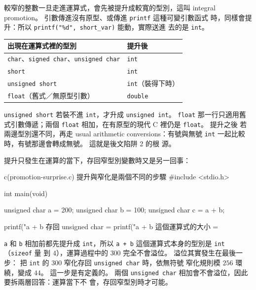 較窄的整數一旦走進運算式，會先被提升成較寬的型別，這叫 integral
promotion。 引數傳進沒有原型、或傳進 \texttt{printf} 這種可變引數函式
時，同樣會提升：所以 \texttt{printf("\%d", short\_var)} 能動，實際送進
去的是 \texttt{int}。

\begin{center}
\begin{tabular}{|l|l|}
\hline
\textbf{出現在運算式裡的型別} & \textbf{提升後} \\
\hline
\texttt{char}、\texttt{signed char}、\texttt{unsigned char} &
\texttt{int} \\
\texttt{short} & \texttt{int} \\
\texttt{unsigned short} & \texttt{int}（裝得下時） \\
\texttt{float}（舊式／無原型引數） & \texttt{double} \\
\hline
\end{tabular}
\end{center}

\texttt{unsigned short} 若裝不進 \texttt{int}，才升成
\texttt{unsigned int}。 \texttt{float} 那一行只適用舊式引數傳遞；兩個
\texttt{float} 相加，在有原型的現代 C 裡仍是 \texttt{float}。 提升之後
若兩邊型別還不同，再走 usual arithmetic conversions：有號與無號
\texttt{int} 一起比較時，有號那邊會轉成無號。 這就是後文陷阱 2 的根
源。


提升只發生在運算的當下，存回窄型別變數時又是另一回事：

\begin{example}{c}{(promotion-surprise.c) 提升與窄化是兩個不同的步驟}
#include <stdio.h>

int main(void) {
    unsigned char a = 200;
    unsigned char b = 100;
    unsigned char c = a + b;

    printf("a + b 存回 unsigned char = %
    printf("a + b 這個運算式的大小 = %
}
\end{example}


\texttt{a} 和 \texttt{b} 相加前都先提升成 \texttt{int}，所以
\texttt{a + b} 這個運算式本身的型別是 \texttt{int}（\texttt{sizeof} 量
到 $4$），運算過程中的 $300$ 完全不會溢位。 溢位其實發生在最後一步：
把 \texttt{int} 的 $300$ 窄化存回 \texttt{unsigned char} 時，依無符號
窄化規則模 $256$ 環繞，變成 $44$。 這一步是有定義的。 兩個
\texttt{unsigned char} 相加會不會溢位，因此要拆兩層回答：運算當下不
會，存回窄型別時才可能。

